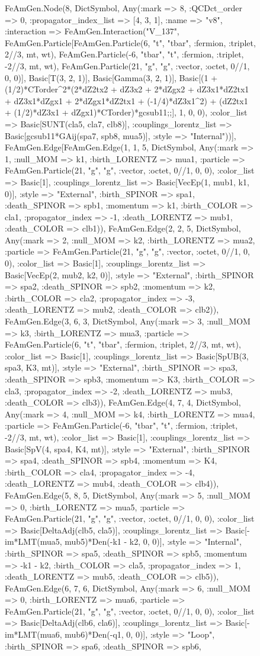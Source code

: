 \documentclass{revtex4}
\begin{document}
\begin{figure}[!htb]
\begin{center}
{FeAmGen.Node(8, Dict{Symbol, Any}(:mark => 8, :QCDct_order => 0, :propagator_index_list => [4, 3, 1], :name => "v8", :interaction => FeAmGen.Interaction("V_137", FeAmGen.Particle[FeAmGen.Particle(6, "t", "tbar", :fermion, :triplet, 2//3, mt, wt), FeAmGen.Particle(-6, "tbar", "t", :fermion, :triplet, -2//3, mt, wt), FeAmGen.Particle(21, "g", "g", :vector, :octet, 0//1, 0, 0)], Basic[T(3, 2, 1)], Basic[Gamma(3, 2, 1)], Basic[(1 + (1/2)*CTorder^2*(2*dZ2tx2 + dZ3x2 + 2*dZgx2 + dZ3x1*dZ2tx1 + dZ3x1*dZgx1 + 2*dZgx1*dZ2tx1 + (-1/4)*dZ3x1^2) + (dZ2tx1 + (1/2)*dZ3x1 + dZgx1)*CTorder)*gcsub11;;], 1, 0, 0), :color_list => Basic[SUNT(cla5, cla7, clb8)], :couplings_lorentz_list => Basic[gcsub11*GAij(spa7, spb8, mua5)], :style => "Internal"))], FeAmGen.Edge[FeAmGen.Edge(1, 1, 5, Dict{Symbol, Any}(:mark => 1, :null_MOM => k1, :birth_LORENTZ => mua1, :particle => FeAmGen.Particle(21, "g", "g", :vector, :octet, 0//1, 0, 0), :color_list => Basic[1], :couplings_lorentz_list => Basic[VecEp(1, mub1, k1, 0)], :style => "External", :birth_SPINOR => spa1, :death_SPINOR => spb1, :momentum => k1, :birth_COLOR => cla1, :propagator_index => -1, :death_LORENTZ => mub1, :death_COLOR => clb1)), FeAmGen.Edge(2, 2, 5, Dict{Symbol, Any}(:mark => 2, :null_MOM => k2, :birth_LORENTZ => mua2, :particle => FeAmGen.Particle(21, "g", "g", :vector, :octet, 0//1, 0, 0), :color_list => Basic[1], :couplings_lorentz_list => Basic[VecEp(2, mub2, k2, 0)], :style => "External", :birth_SPINOR => spa2, :death_SPINOR => spb2, :momentum => k2, :birth_COLOR => cla2, :propagator_index => -3, :death_LORENTZ => mub2, :death_COLOR => clb2)), FeAmGen.Edge(3, 6, 3, Dict{Symbol, Any}(:mark => 3, :null_MOM => k3, :birth_LORENTZ => mua3, :particle => FeAmGen.Particle(6, "t", "tbar", :fermion, :triplet, 2//3, mt, wt), :color_list => Basic[1], :couplings_lorentz_list => Basic[SpUB(3, spa3, K3, mt)], :style => "External", :birth_SPINOR => spa3, :death_SPINOR => spb3, :momentum => K3, :birth_COLOR => cla3, :propagator_index => -2, :death_LORENTZ => mub3, :death_COLOR => clb3)), FeAmGen.Edge(4, 7, 4, Dict{Symbol, Any}(:mark => 4, :null_MOM => k4, :birth_LORENTZ => mua4, :particle => FeAmGen.Particle(-6, "tbar", "t", :fermion, :triplet, -2//3, mt, wt), :color_list => Basic[1], :couplings_lorentz_list => Basic[SpV(4, spa4, K4, mt)], :style => "External", :birth_SPINOR => spa4, :death_SPINOR => spb4, :momentum => K4, :birth_COLOR => cla4, :propagator_index => -4, :death_LORENTZ => mub4, :death_COLOR => clb4)), FeAmGen.Edge(5, 8, 5, Dict{Symbol, Any}(:mark => 5, :null_MOM => 0, :birth_LORENTZ => mua5, :particle => FeAmGen.Particle(21, "g", "g", :vector, :octet, 0//1, 0, 0), :color_list => Basic[DeltaAdj(clb5, cla5)], :couplings_lorentz_list => Basic[-im*LMT(mua5, mub5)*Den(-k1 - k2, 0, 0)], :style => "Internal", :birth_SPINOR => spa5, :death_SPINOR => spb5, :momentum => -k1 - k2, :birth_COLOR => cla5, :propagator_index => 1, :death_LORENTZ => mub5, :death_COLOR => clb5)), FeAmGen.Edge(6, 7, 6, Dict{Symbol, Any}(:mark => 6, :null_MOM => 0, :birth_LORENTZ => mua6, :particle => FeAmGen.Particle(21, "g", "g", :vector, :octet, 0//1, 0, 0), :color_list => Basic[DeltaAdj(clb6, cla6)], :couplings_lorentz_list => Basic[-im*LMT(mua6, mub6)*Den(-q1, 0, 0)], :style => "Loop", :birth_SPINOR => spa6, :death_SPINOR => spb6, }
\end{center}
\end{figure}
\end{document}
